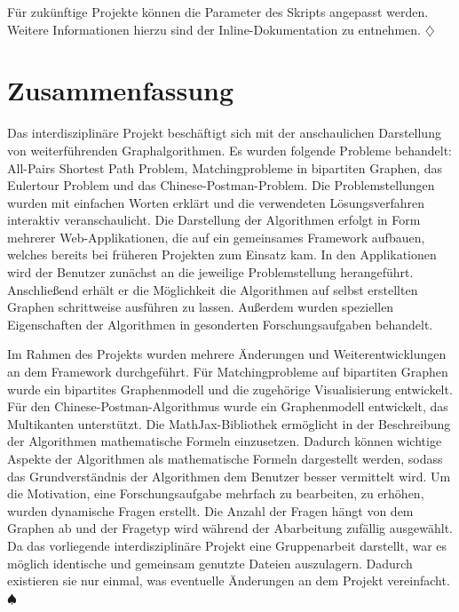 Für zukünftige Projekte können die Parameter des Skripts angepasst werden. Weitere Informationen hierzu sind der Inline-Dokumentation zu entnehmen. \hfill$\diamondsuit$

\chapter{Zusammenfassung} %
Das interdisziplinäre Projekt beschäftigt sich mit der anschaulichen Darstellung von weiterführenden Graphalgorithmen. Es wurden folgende Probleme behandelt: All-Pairs Shortest Path Problem, Matchingprobleme in bipartiten Graphen, das Eulertour Problem und das Chinese-Postman-Problem. 
Die Problemstellungen wurden mit einfachen Worten erklärt und die verwendeten Lösungsverfahren interaktiv veranschaulicht. Die Darstellung der Algorithmen erfolgt in Form mehrerer Web-Applikationen, die auf ein gemeinsames Framework aufbauen, welches bereits bei früheren Projekten zum Einsatz kam. In den Applikationen wird der Benutzer zunächst an die jeweilige Problemstellung herangeführt. Anschließend erhält er die Möglichkeit die Algorithmen auf selbst erstellten Graphen schrittweise ausführen zu lassen. Außerdem wurden speziellen Eigenschaften der Algorithmen in gesonderten Forschungsaufgaben behandelt. 

Im Rahmen des Projekts wurden mehrere Änderungen und Weiterentwicklungen an dem Framework durchgeführt. Für Matchingprobleme auf bipartiten Graphen wurde ein bipartites Graphenmodell und die zugehörige Visualisierung entwickelt. Für den Chinese-Postman-Algorithmus wurde ein Graphenmodell entwickelt, das Multikanten unterstützt. 
Die MathJax-Bibliothek ermöglicht in der Beschreibung der Algorithmen mathematische Formeln einzusetzen. Dadurch können wichtige Aspekte der Algorithmen als mathematische Formeln dargestellt werden, sodass das Grundverständnis der Algorithmen dem Benutzer besser vermittelt wird.
Um die Motivation, eine Forschungsaufgabe mehrfach zu bearbeiten, zu erhöhen, wurden dynamische Fragen erstellt. Die Anzahl der Fragen hängt von dem Graphen ab und der Fragetyp wird während der Abarbeitung zufällig ausgewählt. Da das vorliegende interdisziplinäre Projekt eine Gruppenarbeit darstellt, war es möglich identische und gemeinsam genutzte Dateien auszulagern. Dadurch existieren sie nur einmal, was eventuelle Änderungen an dem Projekt vereinfacht. \hfill$\spadesuit$
